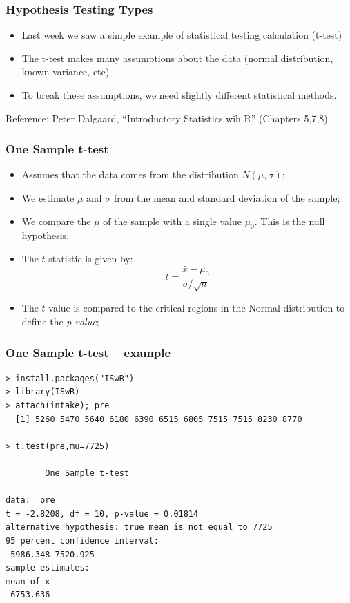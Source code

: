 \documentclass[10pt]{beamer}
\begin{document}
\begin{frame}
  \frametitle{Hypothesis Testing Types}
  
  \begin{itemize}
  \item Last week we saw a simple example of statistical testing
    calculation (t-test)
  \item The t-test makes many assumptions about the data (normal
    distribution, known variance, etc)
  \item To break these assumptions, we need slightly different
    statistical methods.
  \end{itemize}
  \vfill

  \small{\hfill Reference: Peter Dalgaard, ``Introductory Statistics
    wih R'' (Chapters 5,7,8)}
\end{frame}

\begin{frame}
  \frametitle{One Sample t-test}
  \begin{itemize}
  \item Assumes that the data comes from the 
    distribution $N(\mu,\sigma)$;
  \item We estimate $\mu$ and $\sigma$ from the mean and standard
    deviation of the sample;
  \item We compare the $\mu$ of the sample with a single value
    $\mu_0$. This is the null hypothesis.
  \item The $t$ statistic is given by:
    \begin{equation*}
      t = \frac{\bar{x} - \mu_0}{\sigma/\sqrt{n}}
    \end{equation*}
  \item The $t$ value is compared to the critical regions in the
    Normal distribution to define the \emph{p value};
  \end{itemize}
\end{frame}

\begin{frame}
  \frametitle{One Sample t-test -- example}
{\small
\begin{verbatim}
> install.packages("ISwR")
> library(ISwR)
> attach(intake); pre
  [1] 5260 5470 5640 6180 6390 6515 6805 7515 7515 8230 8770

> t.test(pre,mu=7725)

        One Sample t-test

data:  pre 
t = -2.8208, df = 10, p-value = 0.01814
alternative hypothesis: true mean is not equal to 7725 
95 percent confidence interval:
 5986.348 7520.925 
sample estimates:
mean of x 
 6753.636
\end{verbatim}
}
\end{frame}
\end{document}
